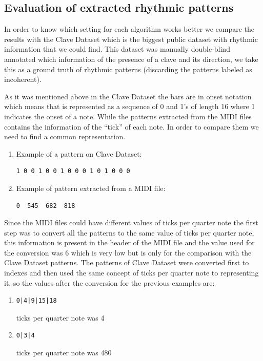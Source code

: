 \documentclass{article}
\begin{document}
\subsection{Evaluation of extracted rhythmic patterns}

In order to know which setting for each algorithm works better we compare the results with the Clave Dataset which is the biggest public dataset with rhythmic information that we could find. This dataset was manually double-blind annotated which information of the presence of a clave and its direction, we take this as a ground truth of rhythmic patterns (discarding the patterns labeled as incoherent).

As it was mentioned above in the Clave Dataset the bars are in onset notation which means that is represented as a sequence of 0 and 1’s of length 16 where 1 indicates the onset of a note. While the patterns extracted from the MIDI files contains the information of the “tick” of each note. In order to compare them we need to find a common representation.

\begin{enumerate}
\item Example of a pattern on Clave Dataset:  \begin{verbatim}1 0 0 1 0 0 1 0 0 0 1 0 1 0 0 0\end{verbatim}
\item Example of pattern extracted from a MIDI file: \begin{verbatim}0  545  682  818\end{verbatim}
\end{enumerate}

Since the MIDI files could have different values of ticks per quarter note the first step was to convert all the patterns to the same value of ticks per quarter note, this information is present in the header of the MIDI file and the value used for the conversion was 6 which is very low but is only for the comparison with the Clave Dataset patterns. 
The patterns of Clave Dataset were converted first to indexes and then used the same concept of ticks per quarter note to representing it, so the values after the conversion for the previous examples are:

\begin{enumerate}
\item \begin{verbatim}0|4|9|15|18\end{verbatim}  ticks per quarter note was 4
\item \begin{verbatim}0|3|4 \end{verbatim} ticks per quarter note was 480
\end{enumerate}
\end{document}
